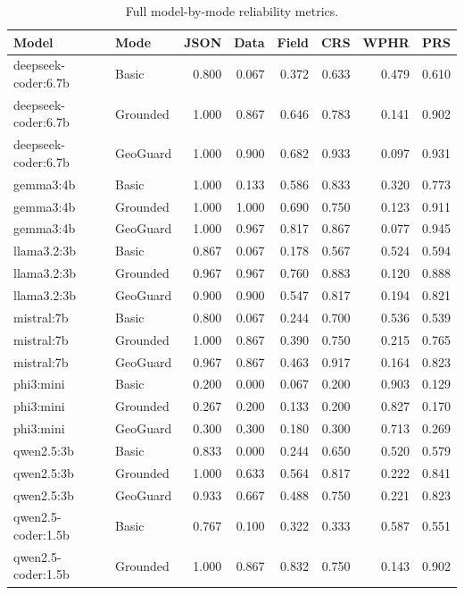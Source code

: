 \documentclass[]{interact}
\begin{document}
\begin{table}[htbp]
\centering
\caption{Full model-by-mode reliability metrics.}
\label{tab:appendix-model-mode}
\small
\setlength{\tabcolsep}{3pt}
\begin{tabular}{llrrrrrr}
\toprule
Model & Mode & JSON & Data & Field & CRS & WPHR & PRS \\
\midrule
deepseek-coder:6.7b & Basic & 0.800 & 0.067 & 0.372 & 0.633 & 0.479 & 0.610 \\
deepseek-coder:6.7b & Grounded & 1.000 & 0.867 & 0.646 & 0.783 & 0.141 & 0.902 \\
deepseek-coder:6.7b & GeoGuard & 1.000 & 0.900 & 0.682 & 0.933 & 0.097 & 0.931 \\
gemma3:4b & Basic & 1.000 & 0.133 & 0.586 & 0.833 & 0.320 & 0.773 \\
gemma3:4b & Grounded & 1.000 & 1.000 & 0.690 & 0.750 & 0.123 & 0.911 \\
gemma3:4b & GeoGuard & 1.000 & 0.967 & 0.817 & 0.867 & 0.077 & 0.945 \\
llama3.2:3b & Basic & 0.867 & 0.067 & 0.178 & 0.567 & 0.524 & 0.594 \\
llama3.2:3b & Grounded & 0.967 & 0.967 & 0.760 & 0.883 & 0.120 & 0.888 \\
llama3.2:3b & GeoGuard & 0.900 & 0.900 & 0.547 & 0.817 & 0.194 & 0.821 \\
mistral:7b & Basic & 0.800 & 0.067 & 0.244 & 0.700 & 0.536 & 0.539 \\
mistral:7b & Grounded & 1.000 & 0.867 & 0.390 & 0.750 & 0.215 & 0.765 \\
mistral:7b & GeoGuard & 0.967 & 0.867 & 0.463 & 0.917 & 0.164 & 0.823 \\
phi3:mini & Basic & 0.200 & 0.000 & 0.067 & 0.200 & 0.903 & 0.129 \\
phi3:mini & Grounded & 0.267 & 0.200 & 0.133 & 0.200 & 0.827 & 0.170 \\
phi3:mini & GeoGuard & 0.300 & 0.300 & 0.180 & 0.300 & 0.713 & 0.269 \\
qwen2.5:3b & Basic & 0.833 & 0.000 & 0.244 & 0.650 & 0.520 & 0.579 \\
qwen2.5:3b & Grounded & 1.000 & 0.633 & 0.564 & 0.817 & 0.222 & 0.841 \\
qwen2.5:3b & GeoGuard & 0.933 & 0.667 & 0.488 & 0.750 & 0.221 & 0.823 \\
qwen2.5-coder:1.5b & Basic & 0.767 & 0.100 & 0.322 & 0.333 & 0.587 & 0.551 \\
qwen2.5-coder:1.5b & Grounded & 1.000 & 0.867 & 0.832 & 0.750 & 0.143 & 0.902 \\

\end{tabular}
\end{table}
\end{document}
